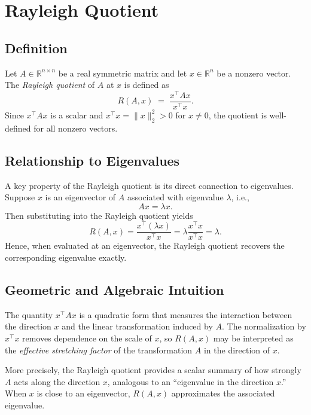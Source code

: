 \documentclass[11pt]{article}
\begin{document}
\section{Rayleigh Quotient}

\subsection{Definition}
Let $A \in \mathbb{R}^{n \times n}$ be a real symmetric matrix and let $x \in \mathbb{R}^n$ be a nonzero vector. The \emph{Rayleigh quotient} of $A$ at $x$ is defined as
\begin{equation}
R(A,x) \;=\; \frac{x^\top A x}{x^\top x}.
\end{equation}
Since $x^\top A x$ is a scalar and $x^\top x = \|x\|_2^2 > 0$ for $x \neq 0$, the quotient is well-defined for all nonzero vectors.

\subsection{Relationship to Eigenvalues}
A key property of the Rayleigh quotient is its direct connection to eigenvalues. Suppose $x$ is an eigenvector of $A$ associated with eigenvalue $\lambda$, i.e.,
\begin{equation}
A x = \lambda x.
\end{equation}
Then substituting into the Rayleigh quotient yields
\begin{equation}
R(A,x)
= \frac{x^\top (\lambda x)}{x^\top x}
= \lambda \frac{x^\top x}{x^\top x}
= \lambda.
\end{equation}
Hence, when evaluated at an eigenvector, the Rayleigh quotient recovers the corresponding eigenvalue exactly.

\subsection{Geometric and Algebraic Intuition}
The quantity $x^\top A x$ is a quadratic form that measures the interaction between the direction $x$ and the linear transformation induced by $A$. The normalization by $x^\top x$ removes dependence on the scale of $x$, so $R(A,x)$ may be interpreted as the \emph{effective stretching factor} of the transformation $A$ in the direction of $x$.

More precisely, the Rayleigh quotient provides a scalar summary of how strongly $A$ acts along the direction $x$, analogous to an ``eigenvalue in the direction $x$.'' When $x$ is close to an eigenvector, $R(A,x)$ approximates the associated eigenvalue.
\end{document}
